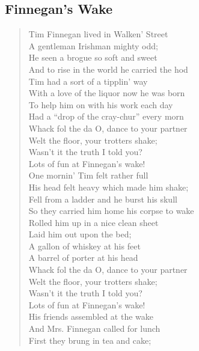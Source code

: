 \documentclass[11pt]{article}
\begin{document}
\subsection{Finnegan's Wake}
\label{sec:org404d66c}
\begin{verse}
Tim Finnegan lived in Walken' Street\\
A gentleman Irishman mighty odd;\\
He seen a brogue so soft and sweet\\
And to rise in the world he carried the hod\\
\vspace*{1em}
Tim had a sort of a tipplin' way\\
With a love of the liquor now he was born\\
To help him on with his work each day\\
Had a ``drop of the cray-chur'' every morn\\
\vspace*{1em}
Whack fol the da O, dance to your partner\\
Welt the floor, your trotters shake;\\
Wasn't it the truth I told you?\\
Lots of fun at Finnegan's wake!\\
One mornin' Tim felt rather full\\
His head felt heavy which made him shake;\\
Fell from a ladder and he burst his skull\\
So they carried him home his corpse to wake\\
\vspace*{1em}
Rolled him up in a nice clean sheet\\
Laid him out upon the bed;\\
A gallon of whiskey at his feet\\
A barrel of porter at his head\\
\vspace*{1em}
Whack fol the da O, dance to your partner\\
Welt the floor, your trotters shake;\\
Wasn't it the truth I told you?\\
Lots of fun at Finnegan's wake!\\
\vspace*{1em}
His friends assembled at the wake\\
And Mrs. Finnegan called for lunch\\
First they brung in tea and cake;\\

\end{verse}
\end{document}
